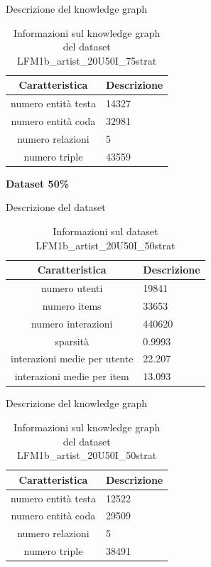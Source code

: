\noindent Descrizione del knowledge graph
\begin{table}[H]
    \centering
    \footnotesize
    \begin{tabularx}{\textwidth}{|c|X|}
        \hline
        \textbf{Caratteristica} & \textbf{Descrizione} \\
        \hline
        numero entità testa & 14327 \\
        \hline
        numero entità coda & 32981 \\
        \hline
        numero relazioni & 5 \\
        \hline
        numero triple & 43559 \\
        \hline
    \end{tabularx}
    \caption{Informazioni sul knowledge graph del dataset LFM1b\_artist\_20U50I\_75strat}
    \label{tab:dataset_info}
\end{table}

\noindent\textbf{Dataset 50\%}

\noindent Descrizione del dataset
\begin{table}[H]
    \centering
    \footnotesize
    \begin{tabularx}{\textwidth}{|c|X|}
        \hline
        \textbf{Caratteristica} & \textbf{Descrizione} \\
        \hline
        numero utenti & 19841 \\
        \hline
        numero items & 33653 \\
        \hline
        numero interazioni & 440620 \\
        \hline
        sparsità &  0.9993 \\
        \hline
        interazioni medie per utente & 22.207 \\
        \hline
        interazioni medie per item & 13.093 \\
        \hline
    \end{tabularx}
    \caption{Informazioni sul dataset LFM1b\_artist\_20U50I\_50strat}
    \label{tab:dataset_info}
\end{table}


\noindent Descrizione del knowledge graph
\begin{table}[H]
    \centering
    \footnotesize
    \begin{tabularx}{\textwidth}{|c|X|}
        \hline
        \textbf{Caratteristica} & \textbf{Descrizione} \\
        \hline
        numero entità testa & 12522 \\
        \hline
        numero entità coda & 29509 \\
        \hline
        numero relazioni & 5 \\
        \hline
        numero triple & 38491 \\
        \hline
    \end{tabularx}
    \caption{Informazioni sul knowledge graph del dataset LFM1b\_artist\_20U50I\_50strat}
    \label{tab:dataset_info}
\end{table}

